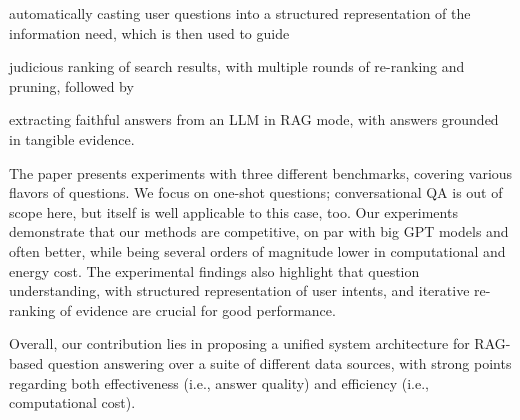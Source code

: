 \squishlist
\item[i)] automatically casting user questions into a structured representation of the information need, which is then used to guide 
\item[ii)] judicious ranking of search results, with multiple rounds of re-ranking and pruning, followed by
\item[iii)]	extracting faithful answers from an LLM in RAG mode, with answers grounded in tangible evidence.
\squishend


\vspace{0.2cm}
\noindent The paper presents experiments with three different benchmarks, covering various flavors of questions.
We focus on one-shot questions; conversational QA is out of scope here, but \method itself is well applicable to this case, too.
Our experiments demonstrate that our methods are competitive, on par with big GPT models and often better,
while being several orders of magnitude lower in computational and energy cost.
The experimental findings also highlight that question understanding, with structured representation of user intents, and iterative re-ranking of evidence are crucial for good performance.

Overall, our contribution lies in proposing a unified system architecture for RAG-based question answering over a suite of different data sources, with strong points regarding both effectiveness (i.e., answer quality)
and efficiency (i.e., computational cost).

